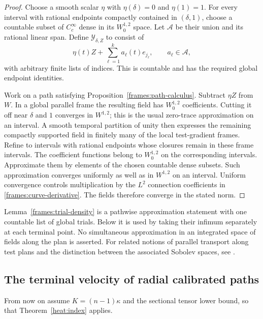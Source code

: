 \begin{proof}
 Choose a smooth scalar $\eta$ with $\eta(\delta)=0$ and
 $\eta(1)=1$.  For every interval with rational endpoints
 compactly contained in $(\delta,1)$, choose a countable
 subset of $C_c^\infty$ dense in its $W^{1,2}_0$ space.
 Let $\mathcal A$ be their union and its rational linear span.
 Define $\mathcal Y_{\delta,Z}$ to consist of
 \[
  \eta(t)Z+\sum_{\ell=1}^k a_\ell(t)e_{j_\ell},
       \qquad a_\ell\in\mathcal A,
 \]
 with arbitrary finite lists of indices.  This is countable
 and has the required global endpoint identities.

 Work on a path satisfying Proposition~\ref{frames:path-calculus}.
 Subtract $\eta Z$ from $W$.  In a global parallel frame the
 resulting field has $W^{1,2}_0$ coefficients.  Cutting it off
 near $\delta$ and $1$ converges in $W^{1,2}$; this is the
 usual zero-trace approximation on an interval.
 A smooth temporal partition of unity then expresses the
 remaining compactly supported field in finitely many of the
 local test-gradient frames.  Refine to intervals with rational
 endpoints whose closures remain in these frame intervals.
 The coefficient functions belong to $W^{1,2}_0$ on the
 corresponding intervals.  Approximate them by elements of
 the chosen countable dense subsets.  Such approximation
 converges uniformly as well as in $W^{1,2}$ on an interval.
 Uniform convergence controls multiplication by the $L^2$
 connection coefficients in \eqref{frames:curve-derivative}.
 The fields therefore converge in the stated norm.
\end{proof}

\begin{remark}\label{frames:pathwise-scope}
 Lemma~\ref{frames:trial-density} is a pathwise approximation
 statement with one countable list of global trials.  Below
 it is used by taking their infimum separately at each
 terminal point.  No simultaneous approximation in an
 integrated space of fields along the plan is asserted.
 For related notions of parallel transport along test plans
 and the distinction between the associated Sobolev spaces,
 see \cite{CGP2022}.
\end{remark}

\subsection{The terminal velocity of radial calibrated paths}
\label{frames:sub-radial}

From now on assume $K=(n-1)\kappa$ and the sectional tensor lower
bound, so that Theorem~\ref{heat:index} applies.

